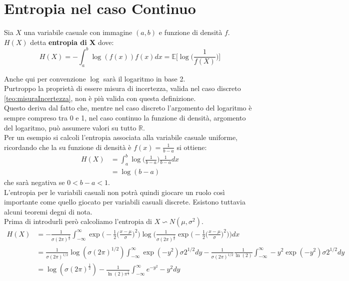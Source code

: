 \section{Entropia nel caso Continuo}
\label{sec:EntropiaContinuo}
\begin{defi}
Sia $X$ una variabile casuale con immagine $(a,b)$ e funzione di densità $f$. $H(X)$ detta \textbf{entropia di X} dove:
$$H(X)=-\int_a^b \log(f(x))f(x)dx= \mathbb{E}\bigg[ \log \bigg( \frac{1}{f(X)} \bigg) \bigg]$$
\end{defi}
Anche qui per convenzione $\log$ sarà il logaritmo in base 2.\\
Purtroppo la proprietà di essere misura di incertezza, valida nel caso discreto \ref{teo:misuraIncertezza}, non è più valida con questa definizione.\\
Questo deriva dal fatto che, mentre nel caso discreto l'argomento del logaritmo è sempre compreso tra 0 e 1, nel caso continuo la funzione di densità, argomento del logaritmo, può assumere valori su tutto $\mathbb{R}$.\\
Per un esempio si calcoli l'entropia associata alla variabile casuale uniforme, ricordando che la su  funzione di densità è $f(x)=\frac{1}{b-a}$ si ottiene:
\[
\begin{split}
H(X)& = \int_a^b \log \bigg( \frac{1}{b-a} \bigg) \frac{1}{b-a} dx \\
& =\log(b-a)
\end{split}
\]
che sarà negativa se $0 < b-a < 1$.\\
L'entropia per le variabili casuali non potrà quindi giocare un ruolo così importante come quello giocato per variabili casuali discrete. Esistono tuttavia alcuni teoremi degni di nota.\\
Prima di introdurli però calcoliamo l'entropia di $X \backsim N(\mu, \sigma^2)$.
\[
\begin{split}
H(X)& = - \frac{1}{\sigma (2 \pi)^{\frac{1}{2}}} \int_{-\infty}^{\infty} \exp \bigg(- \frac{1}{2} \bigg( \frac{x-\mu}{\sigma} \bigg)^2 \bigg) \log \bigg( \frac{1}{\sigma (2\pi)^{\frac{1}{2}}} \exp \bigg( - \frac{1}{2} \bigg( \frac{x-\mu}{ \sigma} \bigg)^2 \bigg)  \bigg) dx  \\ 
&=\frac{1}{\sigma(2 \pi )^{1/2}} \log (\sigma(2 \pi )^{1/2}) \int_{-\infty}^{\infty} \exp ( -y^2 ) \sigma 2^{1/2} dy - \frac{1}{\sigma (2 \pi)^{1/2}} \frac{1}{\ln (2)}   \int_{-\infty}^{\infty} -y^2 \exp (-y^2) \sigma 2^{1/2} dy \\
& = \log (\sigma (2 \pi)^{\frac{1}{2}})- \frac{1}{\ln(2) \pi^{\frac{1}{2}}}\int_{-\infty}^{\infty} e^{-y^2}-y^2 dy
\end{split}
\]
